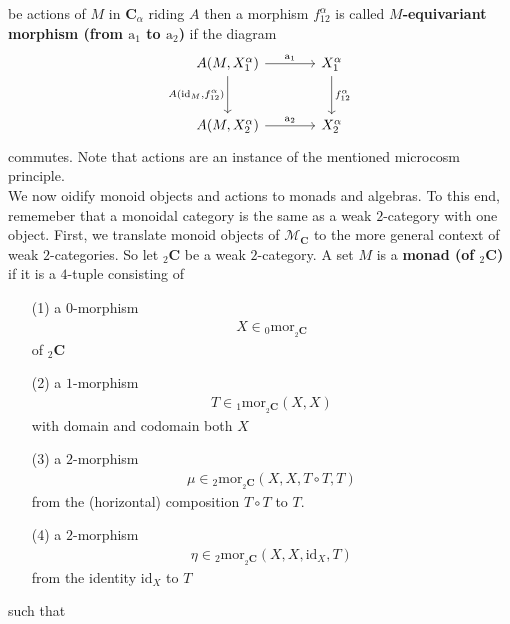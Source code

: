 be actions of $M$ in $\mathbf{C}_{\alpha}$ riding $A$ then a morphism $f_{12}^{\alpha}$ is called \textbf{$M$-equivariant morphism (from $\mathrm{a}_{1}$ to $\mathrm{a}_{2}$)} if the diagram
\[
\begin{tikzcd}[sep=large]
  A(M,X_{1}^{\alpha})
  \arrow{r}{\mathrm{a}_{1}}
  \arrow[swap]{d}{A(\mathrm{id}_{M},f_{12}^{\alpha})}
  &
  X_{1}^{\alpha}
  \arrow{d}{f_{12}^{\alpha}}
  \\
  A(M,X_{2}^{\alpha})
  \arrow{r}{\mathrm{a}_{2}}
  &
  X_{2}^{\alpha}
\end{tikzcd}
\]
commutes. Note that actions are an instance of the mentioned microcosm principle.
\\
We now oidify monoid objects and actions to monads and algebras. To this end, rememeber that a monoidal category is the same as a weak $2$-category with one object. First, we translate monoid objects of $\mathcal{M}_{\mathbf{C}}$ to the more general context of weak $2$-categories. So let ${}_{2}\mathbf{C}$ be a weak $2$-category. A set $M$ is a \textbf{monad (of ${}_{2}\mathbf{C}$)} if it is a $4$-tuple consisting of
\begin{enumerate}
\item[(1)]
a $0$-morphism
\begin{align*}
  X
  \in
  {}_{0}\mathrm{mor}_{{}_{2}\mathbf{C}}
\end{align*}
of ${}_{2}\mathbf{C}$
\item[(2)]
a $1$-morphism
\begin{align*}
  T
  \in
  {}_{1}\mathrm{mor}_{{}_{2}\mathbf{C}}(X,X)
\end{align*}
with domain and codomain both $X$
\item[(3)]
a $2$-morphism
\begin{align*}
  \mu
  \in
  {}_{2}\mathrm{mor}_{{}_{2}\mathbf{C}}
  \left(
    X,
    X,
    T
    \circ
    T,
    T
  \right)
\end{align*}
from the (horizontal) composition $T \circ T$ to $T$.
\item[(4)]
a $2$-morphism
\begin{align*}
  \eta
  \in
  {}_{2}\mathrm{mor}_{{}_{2}\mathbf{C}}(X,X,\mathrm{id}_{X},T)
\end{align*}
from the identity $\mathrm{id}_{X}$ to $T$
\end{enumerate}
such that
